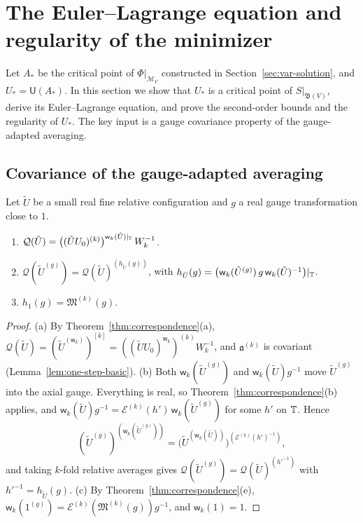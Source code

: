 \section{The Euler--Lagrange equation and regularity of the minimizer}\label{sec:var-regularity}

Let $A_*$ be the critical point of $\Phi|_{\mathcal M_V}$ constructed in Section~\ref{sec:var-solution}, and $U_*=\mathsf U(A_*)$. In this section we show that $U_*$ is a critical point of $S|_{\mathfrak B(V)}$, derive its Euler--Lagrange equation, and prove the second-order bounds and the regularity of $U_*$. The key input is a gauge covariance property of the gauge-adapted averaging.

\subsection{Covariance of the gauge-adapted averaging}\label{ss:27.1}

\begin{lemma}\label{lem:Q-covariance}
Let $\tilde U$ be a small real fine relative configuration and $g$ a real gauge transformation close to $1$.
\begin{enumerate}[label=(\alph*)]
\item $\mathcal Q(\tilde U)=\big((\tilde UU_0)^{(k)}\big)^{\mathsf w_k(\tilde U)|_\mathbb T}\,W_k^{-1}$.
\item $\mathcal Q(\tilde U^{(g)})=\mathcal Q(\tilde U)^{(h_{\tilde U}(g))}$, with $h_{\tilde U}(g)=\big(\mathsf w_k(\tilde U^{(g)})\,g\,\mathsf w_k(\tilde U)^{-1}\big)|_\mathbb T$.
\item $h_1(g)=\mathfrak M^{(k)}(g)$.
\end{enumerate}
\end{lemma}

\begin{proof}
(a) By Theorem~\ref{thm:correspondence}(a), $\mathcal Q(\tilde U)=(\tilde U^{(\mathsf w_k)})^{[k]}=((\tilde UU_0)^{\mathsf w_k})^{(k)}W_k^{-1}$, and $\mathfrak a^{(k)}$ is covariant (Lemma~\ref{lem:one-step-basic}). (b) Both $\mathsf w_k(\tilde U^{(g)})$ and $\mathsf w_k(\tilde U)g^{-1}$ move $\tilde U^{(g)}$ into the axial gauge. Everything is real, so Theorem~\ref{thm:correspondence}(b) applies, and $\mathsf w_k(\tilde U)g^{-1}=\mathcal E^{(k)}(h')\,\mathsf w_k(\tilde U^{(g)})$ for some $h'$ on $\mathbb T$. Hence
\[
(\tilde U^{(g)})^{(\mathsf w_k(\tilde U^{(g)}))}=\big(\tilde U^{(\mathsf w_k(\tilde U))}\big)^{(\mathcal E^{(k)}(h')^{-1})},
\]
and taking $k$-fold relative averages gives $\mathcal Q(\tilde U^{(g)})=\mathcal Q(\tilde U)^{(h'^{-1})}$ with $h'^{-1}=h_{\tilde U}(g)$. (c) By Theorem~\ref{thm:correspondence}(e), $\mathsf w_k(1^{(g)})=\mathcal E^{(k)}(\mathfrak M^{(k)}(g))g^{-1}$, and $\mathsf w_k(1)=1$.
\end{proof}

